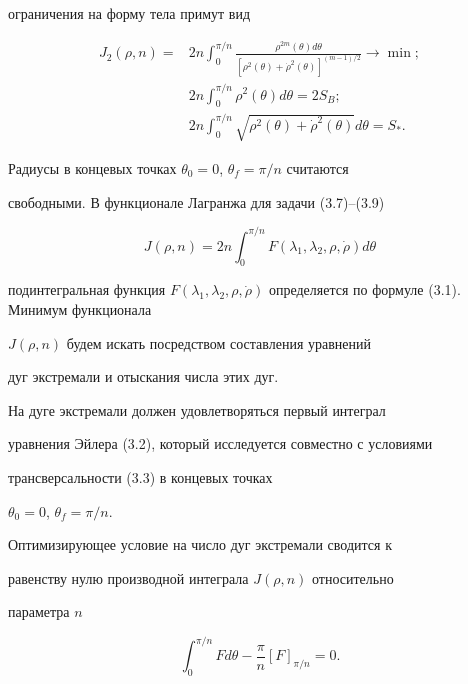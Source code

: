 ограничения на форму тела примут вид


\begin{align}


J_2 (\rho, n) = &2 n  \int_0^{\pi/n} \frac


{\rho^{2m} (\theta) d\theta}


{[ \rho^2 (\theta) + \Dot{\rho}^2 (\theta)


]^{(m-1)/2}} \to \min; \\


&2 n \int_{0}^{\pi/n} \rho^2 (\theta) d\theta = 2 S_B;\\


&2 n \int_0^{\pi/n} \sqrt { \rho^2 (\theta) + \Dot{\rho}^2


(\theta)} d\theta = S_*. 


\end{align}


Радиусы в концевых точках $\theta_0 = 0$, $\theta_f = \pi / n$ считаются


свободными. В функционале Лагранжа для задачи (3.7)--(3.9)


$$


J(\rho, n) = 2 n \int_0^{\pi/n}


F (\lambda_1, \lambda_2, \rho, \Dot{\rho}) d\theta


$$


подинтегральная функция $F (\lambda_1, \lambda_2, \rho,


\Dot{\rho})$ определяется по формуле (3.1). Минимум функционала


$J(\rho, n)$ будем искать посредством составления уравнений


дуг экстремали и отыскания числа этих дуг.





На дуге экстремали должен удовлетворяться первый интеграл


уравнения Эйлера (3.2), который исследуется совместно с условиями


трансверсальности (3.3) в концевых точках


$\theta_0 = 0$, $\theta_f = \pi / n$.


Оптимизирующее условие на число дуг экстремали сводится к


равенству нулю производной интеграла $J(\rho,n)$ относительно


параметра $n$


\begin{equation}


\int_0^{\pi/n} F d\theta - \frac{\pi}{n} [F]_{\pi /n}


= 0.


\end{equation}


